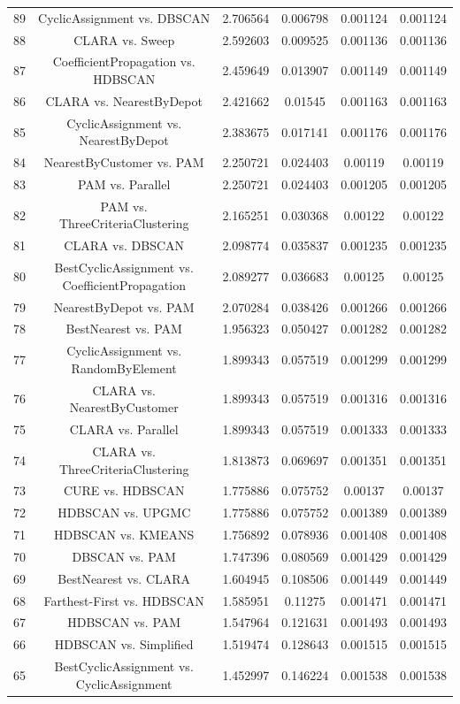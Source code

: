 \documentclass[a4paper,10pt]{article}
\begin{document}
\begin{landscape}
\begin{table}[!htp]
\begin{tabular}{cccccc}
89&CyclicAssignment vs. DBSCAN&2.706564&0.006798&0.001124&0.001124\\
88&CLARA vs. Sweep&2.592603&0.009525&0.001136&0.001136\\
87&CoefficientPropagation vs. HDBSCAN&2.459649&0.013907&0.001149&0.001149\\
86&CLARA vs. NearestByDepot&2.421662&0.01545&0.001163&0.001163\\
85&CyclicAssignment vs. NearestByDepot&2.383675&0.017141&0.001176&0.001176\\
84&NearestByCustomer vs. PAM&2.250721&0.024403&0.00119&0.00119\\
83&PAM vs. Parallel&2.250721&0.024403&0.001205&0.001205\\
82&PAM vs. ThreeCriteriaClustering&2.165251&0.030368&0.00122&0.00122\\
81&CLARA vs. DBSCAN&2.098774&0.035837&0.001235&0.001235\\
80&BestCyclicAssignment vs. CoefficientPropagation&2.089277&0.036683&0.00125&0.00125\\
79&NearestByDepot vs. PAM&2.070284&0.038426&0.001266&0.001266\\
78&BestNearest vs. PAM&1.956323&0.050427&0.001282&0.001282\\
77&CyclicAssignment vs. RandomByElement&1.899343&0.057519&0.001299&0.001299\\
76&CLARA vs. NearestByCustomer&1.899343&0.057519&0.001316&0.001316\\
75&CLARA vs. Parallel&1.899343&0.057519&0.001333&0.001333\\
74&CLARA vs. ThreeCriteriaClustering&1.813873&0.069697&0.001351&0.001351\\
73&CURE vs. HDBSCAN&1.775886&0.075752&0.00137&0.00137\\
72&HDBSCAN vs. UPGMC&1.775886&0.075752&0.001389&0.001389\\
71&HDBSCAN vs. KMEANS&1.756892&0.078936&0.001408&0.001408\\
70&DBSCAN vs. PAM&1.747396&0.080569&0.001429&0.001429\\
69&BestNearest vs. CLARA&1.604945&0.108506&0.001449&0.001449\\
68&Farthest-First vs. HDBSCAN&1.585951&0.11275&0.001471&0.001471\\
67&HDBSCAN vs. PAM&1.547964&0.121631&0.001493&0.001493\\
66&HDBSCAN vs. Simplified&1.519474&0.128643&0.001515&0.001515\\
65&BestCyclicAssignment vs. CyclicAssignment&1.452997&0.146224&0.001538&0.001538\\

\end{tabular}
\end{table}
\end{landscape}
\end{document}
